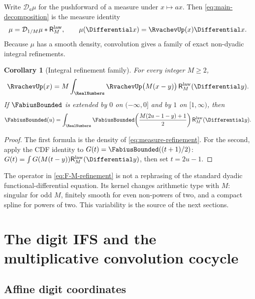 \documentclass[11pt,oneside]{article}
\newtheorem{corollary}[theorem]{Corollary}
\theoremstyle{definition}
\theoremstyle{remark}
\newcommand{\D}{\mathcal D}
\newcommand{\ReciprocalIntegerLaw}[1]{\mathsf R^{\mathrm{law}}_{#1}}
\begin{document}
Write $\D_a\mu$ for the pushforward of a measure under $x\mapsto ax$.  Then
\eqref{eq:main-decomposition} is the measure identity
\begin{equation}
 \mu=\D_{1/M}\mu*\ReciprocalIntegerLaw{M},
 \qquad \mu(\Differential x)=\RvachevUp(x)\Differential x.
 \label{eq:measure-refinement}
\end{equation}
Because $\mu$ has a smooth density, convolution gives a family of exact non-dyadic
integral refinements.

\begin{corollary}[Integral refinement family]
\label{cor:Up-refinement}
For every integer $M\ge2$,
\begin{equation}
 \RvachevUp(x)=M\int_{\RealNumbers}\RvachevUp\bigl(M(x-y)\bigr)\,\ReciprocalIntegerLaw{M}(\Differential y).
 \label{eq:Up-M-refinement}
\end{equation}
If $\FabiusBounded$ is extended by $0$ on $(-\infty,0]$ and by $1$ on $[1,\infty)$, then
\begin{equation}
 \FabiusBounded(u)=\int_{\RealNumbers}
 \FabiusBounded\!\left(\frac{M(2u-1-y)+1}{2}\right)\ReciprocalIntegerLaw{M}(\Differential y).
 \label{eq:F-M-refinement}
\end{equation}
\end{corollary}

\begin{proof}
The first formula is the density of \eqref{eq:measure-refinement}.  For the second, apply
the CDF identity to $G(t)=\FabiusBounded((t+1)/2)$:
$G(t)=\int G(M(t-y))\ReciprocalIntegerLaw{M}(\Differential y)$, then set $t=2u-1$.
\end{proof}

The operator in \eqref{eq:F-M-refinement} is not a rephrasing of the standard dyadic
functional-differential equation.  Its kernel changes arithmetic type with $M$: singular for
odd $M$, finitely smooth for even non-powers of two, and a compact spline for powers of two.
This variability is the source of the next sections.

\section{The digit IFS and the multiplicative convolution cocycle}
\label{sec:digit-ifs}

\subsection{Affine digit coordinates}
\end{document}

